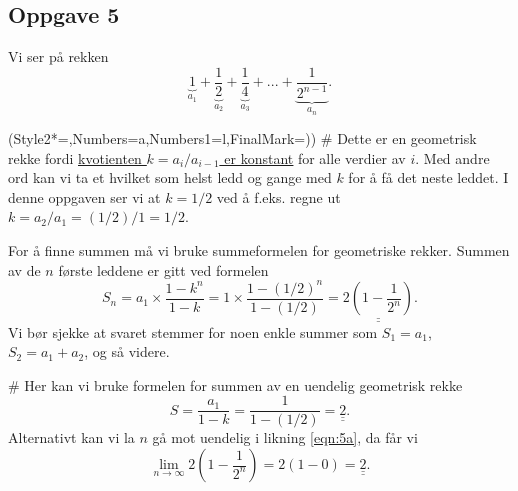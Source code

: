 \documentclass[12pt, a4paper]
{article}						%
\def\answer#1{\underline{\underline{#1}}}
\begin{document}
\subsection*{Oppgave 5}
Vi ser på rekken
\begin{equation*}
	\underset{a_1}{\underbrace{1}} + \underset{a_2}{\underbrace{\frac{1}{2}}} + \underset{a_3}{\underbrace{\frac{1}{4}}} + ... + \underset{a_n}{\underbrace{\frac{1}{2^{n-1}}}}.
\end{equation*}
\begin{easylist}[enumerate]
	\ListProperties(Style2*=,Numbers=a,Numbers1=l,FinalMark={)})
	# Dette er en geometrisk rekke fordi \answer{kvotienten $k = a_i / a_{i-1}$ er konstant} for alle verdier av $i$.
	Med andre ord kan vi ta et hvilket som helst ledd og gange med $k$ for å få det neste leddet. I denne oppgaven ser vi at
	$k = 1/2$ ved å f.eks. regne ut $k = a_2 / a_{1} = (1/2)/1 = 1/2$.
	
	For å finne summen må vi bruke summeformelen for geometriske rekker. 
	Summen av de $n$ første leddene er gitt ved formelen
	\begin{equation}
	\label{eqn:5a}
		S_n = a_1 \times \frac{1-k^n}{1-k} = 1 \times \frac{1-(1/2)^n}{1-(1/2)} = \answer{2 \left( 1-\frac{1}{2^n} \right)}.
	\end{equation}
	Vi bør sjekke at svaret stemmer for noen enkle summer som $S_1 = a_1$, $S_2 = a_1 + a_2$, og så videre.
	
	# Her kan vi bruke formelen for summen av en uendelig geometrisk rekke
	\begin{equation*}
		S = \frac{a_1}{1 - k} = \frac{1}{1 - (1/2)} = \answer{2}.
	\end{equation*}
	Alternativt kan vi la $n$ gå mot uendelig i likning \eqref{eqn:5a}, da får vi
	\begin{equation*}
		\lim_{n \to \infty } 2 \left( 1-\frac{1}{2^n} \right)= 2 \left( 1-0 \right) = \answer{2}.
	\end{equation*}
\end{easylist}
\end{document}
